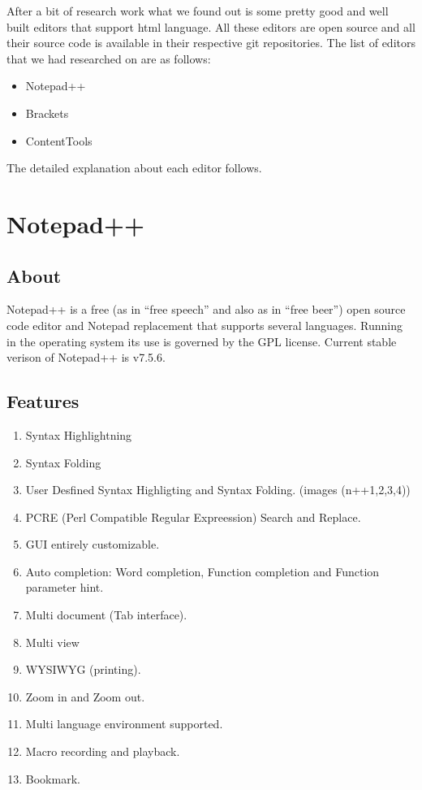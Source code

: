 After a bit of research work what we found out is some pretty good and well built editors
that support html language. All these editors are open source and all their source code is
available in their respective git repositories. The list of editors that we had researched on
are as follows: \newline
\begin{itemize}
\item Notepad++
\item Brackets
\item ContentTools
\end{itemize}
The detailed explanation about each editor follows.
\section{Notepad++}
\subsection{About}
Notepad++ is a free (as in “free speech” and also as in “free beer”) open source code editor
and Notepad replacement that supports several languages. Running in the operating system
its use is governed by the GPL license. \newline\newline
Current stable verison of Notepad++  is v7.5.6. \newline
\subsection{Features} 
\begin{enumerate}
\item Syntax Highlightning
\item Syntax Folding
\item User Desfined Syntax Highligting and Syntax Folding. (images (n++1,2,3,4))\item PCRE (Perl Compatible Regular Expreession) Search and Replace.
\item GUI entirely customizable.
\item Auto completion: Word completion, Function completion and Function parameter hint.
\item Multi document (Tab interface).
\item Multi view
\item WYSIWYG (printing).
\item Zoom in and Zoom out.
\item Multi language environment supported.
\item Macro recording and playback.
\item Bookmark.  \newline
\end{enumerate}
